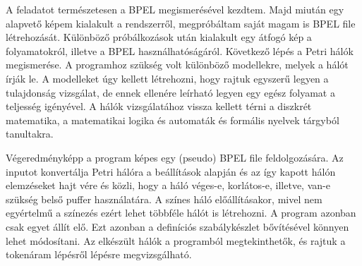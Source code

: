 
A feladatot természetesen a BPEL megismerésével kezdtem. Majd miután egy alapvető képem kialakult a rendszerről, megpróbáltam saját magam is BPEL file létrehozását. Különböző próbálkozások után kialakult egy átfogó kép a folyamatokról, illetve a BPEL használhatóságáról. Következő lépés a Petri hálók megismerése.
A programhoz szükség volt különböző modellekre, melyek a hálót írják le. A modelleket úgy kellett létrehozni, hogy rajtuk egyszerű legyen a tulajdonság vizsgálat, de ennek ellenére leírható legyen egy egész folyamat a teljesség igényével. 
A hálók vizsgálatához vissza kellett térni a diszkrét matematika, a matematikai logika és automaták és formális nyelvek tárgyból tanultakra. 

Végeredményképp a program képes egy (pseudo) BPEL file feldolgozására. Az inputot konvertálja Petri hálóra a beállítások alapján és az így kapott hálón elemzéseket hajt vére és közli, hogy a háló véges-e, korlátos-e, illetve, van-e szükség belső puffer használatára. A színes háló előállításakor, mivel nem egyértelmű a színezés ezért lehet többféle hálót is létrehozni. A program azonban csak egyet állít elő. Ezt azonban a definíciós szabálykészlet bővítésével könnyen lehet módosítani. Az elkészült hálók a programból megtekinthetők, és rajtuk a tokenáram lépésről lépésre megvizsgálható. 

